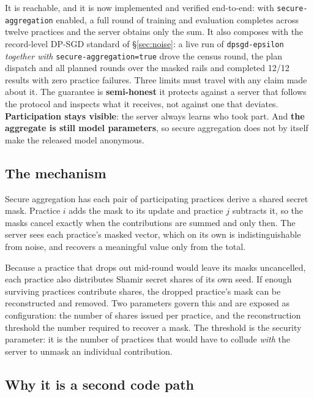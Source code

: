 \label{sec:secagg}
\statusMethod

\begin{shortanswer}
It is reachable, and it is now implemented and verified end-to-end: with
\texttt{secure-aggregation} enabled, a full round of training and evaluation completes across twelve
practices and the server obtains only the sum. It also composes with the record-level DP-SGD standard
of \S\ref{sec:noise}: a live run of \texttt{dpsgd-epsilon} \emph{together with}
\texttt{secure-aggregation=true} drove the census round, the plan dispatch and all planned rounds over
the masked rails and completed 12/12 results with zero practice failures. Three limits must travel
with any claim made about it. The guarantee is \textbf{semi-honest} it protects against a server that follows the protocol
and inspects what it receives, not against one that deviates. \textbf{Participation stays visible}:
the server always learns who took part. And \textbf{the aggregate is still model parameters}, so
secure aggregation does not by itself make the released model anonymous.
\end{shortanswer}

\subsection{The mechanism}

Secure aggregation \cite{bonawitz2017secagg} has each pair of participating practices derive a
shared secret mask. Practice $i$ adds the mask to its update and practice $j$ subtracts it, so the
masks cancel exactly when the contributions are summed and only then. The server sees each
practice's masked vector, which on its own is indistinguishable from noise, and recovers a
meaningful value only from the total.

Because a practice that drops out mid-round would leave its masks uncancelled, each practice also
distributes Shamir secret shares of its own seed. If enough surviving practices contribute shares,
the dropped practice's mask can be reconstructed and removed. Two parameters govern this and are
exposed as configuration: the number of shares issued per practice, and the reconstruction threshold
the number required to recover a mask. The threshold is the security parameter: it is the number
of practices that would have to collude \emph{with} the server to unmask an individual contribution.

\subsection{Why it is a second code path}

